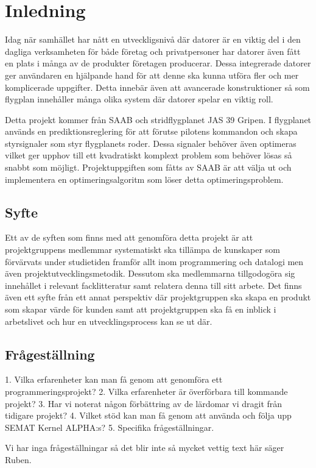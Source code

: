 \section{Inledning}
Idag när samhället har nått en utveckligsnivå där datorer är en viktig del i den dagliga verksamheten för både företag och privatpersoner har datorer även fått en plats i många av de produkter företagen producerar. Dessa integrerade datorer ger användaren en hjälpande hand för att denne ska kunna utföra fler och mer komplicerade uppgifter. Detta innebär även att avancerade konstruktioner så som flygplan innehåller många olika system där datorer spelar en viktig roll.

Detta projekt kommer från SAAB och stridflygplanet JAS 39 Gripen. I flygplanet används en prediktionsreglering för att förutse pilotens kommandon och skapa styrsignaler som styr flygplanets roder. Dessa signaler behöver även optimeras vilket ger upphov till ett kvadratiskt komplext problem som behöver lösas så snabbt som möjligt. Projektuppgiften som fåtts av SAAB är att välja ut och implementera en optimeringsalgoritm som löser detta optimeringsproblem.

\subsection{Syfte}
Ett av de syften som finns med att genomföra detta projekt är att projektgruppens medlemmar systematiskt ska tillämpa de kunskaper som förvärvats under studietiden framför allt inom programmering och datalogi men även projektutvecklingsmetodik. Dessutom ska medlemmarna tillgodogöra sig innehållet i relevant facklitteratur samt relatera denna till sitt arbete. 
Det finns även ett syfte från ett annat perspektiv där projektgruppen ska skapa en produkt som skapar värde för kunden samt att projektgruppen ska få en inblick i arbetslivet och hur en utvecklingsprocess kan se ut där.

\subsection{Frågeställning}
1. Vilka erfarenheter kan man få genom att genomföra ett programmeringsprojekt?
2. Vilka erfarenheter är överförbara till kommande projekt?
3. Har vi noterat någon förbättring av de lärdomar vi dragit från tidigare projekt?
4. Vilket stöd kan man få genom att använda och följa upp SEMAT Kernel ALPHA:s?
5. Specifika frågeställningar.

Vi har inga frågeställningar så det blir inte så mycket vettig text här säger Ruben.

